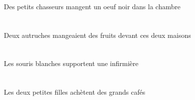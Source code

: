 \begin{exe}
\ex\glll
    \DEFSgObl{}   \chambreBSgObl{}   \DANS{}   \INDPlErg{}   \petitCPl{}   \chasseurCPlErg{}   \INDSgAbs{}   \noirCSg{}   \oeufCSgAbs{}  \mangerVtPrsCSg{} \\
    \DEFSgOblP{}   \chambreBSgOblP{}   \DANSP{}   \INDPlErgP{}   \petitCPlP{}   \chasseurCPlErgP{}   \INDSgAbsP{}   \noirCSgP{}   \oeufCSgAbsP{}  \mangerVtPrsCSgP{} \\
    \DEFSgOblG{}   \chambreBSgOblG{}   \DANSG{}   \INDPlErgG{}   \petitCPlG{}   \chasseurCPlErgG{}   \INDSgAbsG{}   \noirCSgG{}   \oeufCSgAbsG{}  \mangerVtPrsCSgG{} \\
 Des petits chasseurs mangent un oeuf noir dans la chambre
\ex\glll
    \DEMDuObl{}   \maisonDDuObl{}   \DEVANT{}   \INDDuErg{}   \autrucheBDuErg{}   \INDPlAbs{}   \fruitAPlAbs{}  \mangerVtPstAPl{} \\
    \DEMDuOblP{}   \maisonDDuOblP{}   \DEVANTP{}   \INDDuErgP{}   \autrucheBDuErgP{}   \INDPlAbsP{}   \fruitAPlAbsP{}  \mangerVtPstAPlP{} \\
    \DEMDuOblG{}   \maisonDDuOblG{}   \DEVANTG{}   \INDDuErgG{}   \autrucheBDuErgG{}   \INDPlAbsG{}   \fruitAPlAbsG{}  \mangerVtPstAPlG{} \\
 Deux autruches mangeaient des fruits devant ces deux maisons
\ex\glll
   \DEFPlErg{}   \blancBPl{}   \sourisBPlErg{}   \INDSgAbs{}   \infirmiereASgAbs{}  \supporterVtPrsASg{} \\
   \DEFPlErgP{}   \blancBPlP{}   \sourisBPlErgP{}   \INDSgAbsP{}   \infirmiereASgAbsP{}  \supporterVtPrsASgP{} \\
   \DEFPlErgG{}   \blancBPlG{}   \sourisBPlErgG{}   \INDSgAbsG{}   \infirmiereASgAbsG{}  \supporterVtPrsASgG{} \\
 Les souris blanches supportent une infirmière
\ex\glll
   \DEFDuErg{}   \petitCDu{}   \filleCDuErg{}   \INDPlAbs{}   \grandCPl{}   \cafeCPlAbs{}  \acheterVtPrsCPl{} \\
   \DEFDuErgP{}   \petitCDuP{}   \filleCDuErgP{}   \INDPlAbsP{}   \grandCPlP{}   \cafeCPlAbsP{}  \acheterVtPrsCPlP{} \\
   \DEFDuErgG{}   \petitCDuG{}   \filleCDuErgG{}   \INDPlAbsG{}   \grandCPlG{}   \cafeCPlAbsG{}  \acheterVtPrsCPlG{} \\
 Les deux petites filles achètent des grands cafés
\ex\glll
    \DEFSgObl{}   \tableDSgObl{}   \SUR{}   \DEFPlErg{}   \infirmiereAPlErg{}    \INDSgDat{}   \NabilDSgDat{}   \DEFSgAbs{}   \balaiASgAbs{}  \donnerVdPrsASg{} \\
    \DEFSgOblP{}   \tableDSgOblP{}   \SURP{}   \DEFPlErgP{}   \infirmiereAPlErgP{}    \INDSgDatP{}   \NabilDSgDatP{}   \DEFSgAbsP{}   \balaiASgAbsP{}  \donnerVdPrsASgP{} \\

\end{exe}
